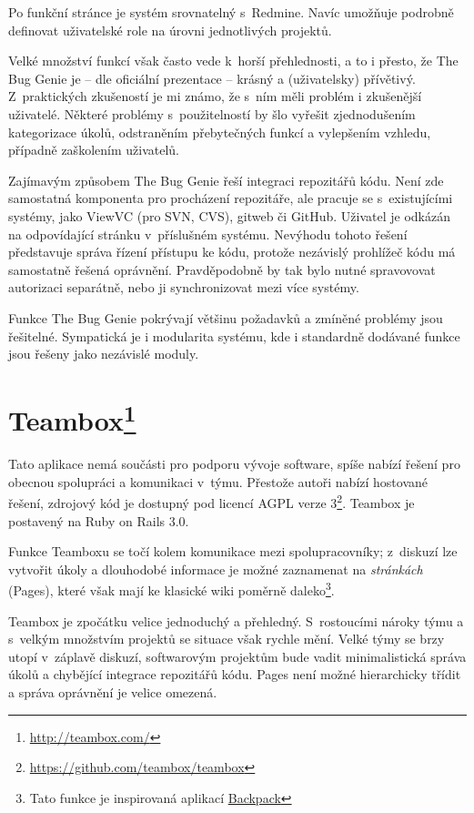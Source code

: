 \documentclass[thesis=B,czech]{FITthesis}[2012/05/02]
\begin{document}
Po funkční stránce je systém srovnatelný s~Redmine. Navíc umožňuje
podrobně definovat uživatelské role na úrovni jednotlivých projektů.

Velké množství funkcí však často vede k~horší přehlednosti, a to i přesto, že
The Bug Genie je -- dle oficiální prezentace -- krásný a
(uživatelsky) přívětivý. Z~praktických zkušeností je mi známo, že s~ním měli problém i
zkušenější uživatelé. Některé problémy s~použitelností by šlo vyřešit
zjednodušením kategorizace úkolů, odstraněním přebytečných funkcí a
vylepšením vzhledu, případně zaškolením uživatelů.

Zajímavým způsobem The Bug Genie řeší integraci repozitářů kódu. 
Není zde samostatná komponenta pro procházení repozitáře, ale pracuje
se s~existujícími systémy, jako ViewVC (pro SVN, CVS), gitweb či GitHub.
Uživatel je odkázán na odpovídající stránku v~příslušném systému.
Nevýhodu tohoto řešení představuje správa řízení přístupu ke kódu, protože
nezávislý prohlížeč kódu má samostatně řešená oprávnění. Pravděpodobně
by tak bylo nutné spravovovat autorizaci separátně, nebo ji
synchronizovat mezi více systémy.

Funkce The Bug Genie pokrývají většinu požadavků a zmíněné problémy jsou
řešitelné. Sympatická je i modularita systému, kde i standardně dodávané
funkce jsou řešeny jako nezávislé moduly.

\section[Teambox]{Teambox\footnote{\url{http://teambox.com/}}}

Tato aplikace nemá součásti pro podporu vývoje software, spíše nabízí
řešení pro obecnou spolupráci a komunikaci v~týmu. Přestože autoři
nabízí hostované řešení, zdrojový kód je dostupný pod licencí \gls{AGPL}
verze 3\footnote{\url{https://github.com/teambox/teambox}}. Teambox je
postavený na Ruby on Rails 3.0.

Funkce Teamboxu se točí kolem komunikace mezi spolupracovníky; z~diskuzí
lze vytvořit úkoly a dlouhodobé informace je možné zaznamenat na
\emph{stránkách} (Pages), které však mají ke klasické wiki poměrně
daleko\footnote{Tato funkce je inspirovaná aplikací
  \href{http://backpackit.com/}{Backpack}}.

Teambox je zpočátku velice jednoduchý a přehledný.
S~rostoucími nároky týmu a s~velkým množstvím projektů se situace však rychle mění.
Velké týmy se brzy utopí v~záplavě diskuzí, softwarovým projektům
bude vadit minimalistická správa úkolů a chybějící integrace repozitářů
kódu. Pages není možné hierarchicky třídit a správa oprávnění je velice
omezená.
\end{document}
